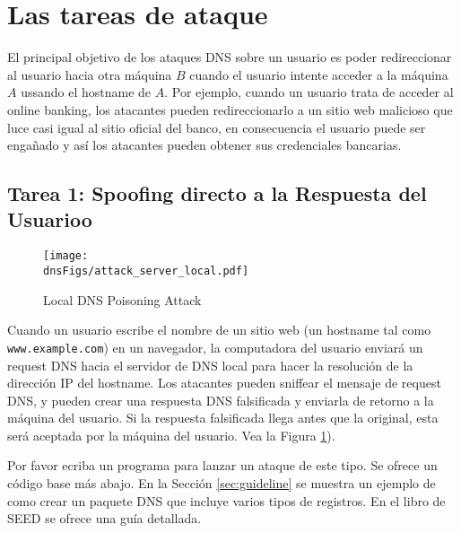 \section{Las tareas de ataque}

El principal objetivo de los ataques DNS sobre un usuario es poder redireccionar al usuario hacia otra máquina $B$ cuando el usuario intente acceder a la máquina $A$ ussando el hostname de $A$. Por ejemplo, cuando un usuario trata de acceder al online banking, los atacantes pueden redireccionarlo a un sitio web malicioso que luce casi igual al sitio oficial del banco, en consecuencia el usuario puede ser engañado y así los atacantes pueden obtener sus credenciales bancarias.



\subsection{Tarea 1: Spoofing directo a la Respuesta del Usuarioo}



\begin{figure}[htb]
\centering
\texttt{[image: \\dnsFigs/attack\_server\_local.pdf]}
\caption{Local DNS Poisoning Attack}
\label{dns:fig:local_attack}
\end{figure}

Cuando un usuario escribe el nombre de un sitio web (un hostname tal como {\tt
www.example.com}) en un navegador, la computadora del usuario enviará un request DNS hacia el servidor de DNS local para hacer la resolución de la dirección IP del hostname.
Los atacantes pueden sniffear el mensaje de request DNS, y pueden crear una respuesta DNS falsificada y enviarla de retorno a la máquina del usuario. Si la respuesta falsificada llega antes que la original, esta será aceptada por la máquina del usuario.
Vea la Figura \ref{dns:fig:local_attack}). 

Por favor ecriba un programa para lanzar un ataque de este tipo. Se ofrece un código base más abajo. En la Sección \ref{sec:guideline} se muestra un ejemplo de como crear un paquete DNS que incluye varios tipos de registros. En el libro de SEED se ofrece una guía detallada.



